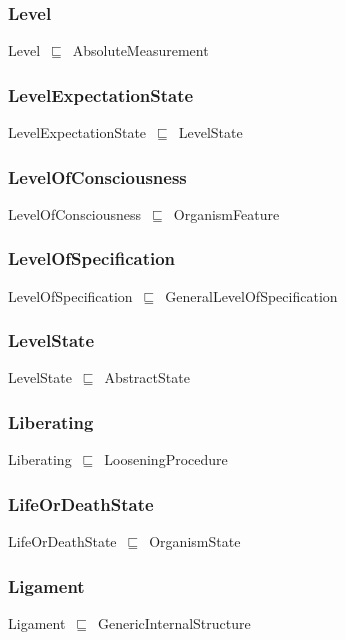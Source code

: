 \documentclass{article}
\begin{document}
\subsubsection*{Level}

Level~\ensuremath{\sqsubseteq}~AbsoluteMeasurement~

\subsubsection*{LevelExpectationState}

LevelExpectationState~\ensuremath{\sqsubseteq}~LevelState~

\subsubsection*{LevelOfConsciousness}

LevelOfConsciousness~\ensuremath{\sqsubseteq}~OrganismFeature~

\subsubsection*{LevelOfSpecification}

LevelOfSpecification~\ensuremath{\sqsubseteq}~GeneralLevelOfSpecification~

\subsubsection*{LevelState}

LevelState~\ensuremath{\sqsubseteq}~AbstractState~

\subsubsection*{Liberating}

Liberating~\ensuremath{\sqsubseteq}~LooseningProcedure~

\subsubsection*{LifeOrDeathState}

LifeOrDeathState~\ensuremath{\sqsubseteq}~OrganismState~

\subsubsection*{Ligament}

Ligament~\ensuremath{\sqsubseteq}~GenericInternalStructure~
\end{document}

